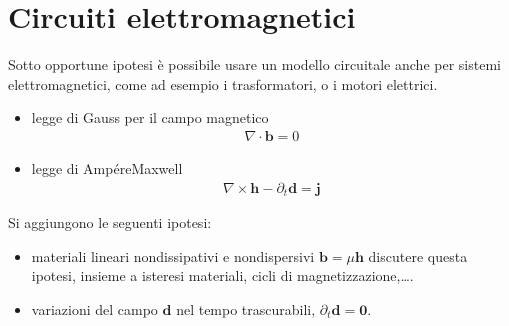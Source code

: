 \documentclass[letterpaper,10pt,italian]{jupyterBook}
\begin{document}
\section{Circuiti elettromagnetici}
\label{\detokenize{ch/circuits-electromagnetic:circuiti-elettromagnetici}}\label{\detokenize{ch/circuits-electromagnetic:classical-electromagnetism-circuits-electromagnetic}}\label{\detokenize{ch/circuits-electromagnetic::doc}}
\sphinxAtStartPar
Sotto opportune ipotesi è possibile usare un modello circuitale anche per sistemi elettromagnetici, come ad esempio i trasformatori, o i motori elettrici.
\begin{itemize}
\item {} 
\sphinxAtStartPar
legge di Gauss per il campo magnetico
\begin{equation*}
\begin{split}\nabla \cdot \mathbf{b} = 0\end{split}
\end{equation*}
\item {} 
\sphinxAtStartPar
legge di Ampére\sphinxhyphen{}Maxwell
\begin{equation*}
\begin{split}\nabla \times \mathbf{h} - \partial_t \mathbf{d} = \mathbf{j}\end{split}
\end{equation*}
\end{itemize}

\sphinxAtStartPar
Si aggiungono le seguenti ipotesi:
\begin{itemize}
\item {} 
\sphinxAtStartPar
materiali lineari non\sphinxhyphen{}dissipativi e non\sphinxhyphen{}dispersivi \(\mathbf{b} = \mu \mathbf{h}\)  discutere questa ipotesi, insieme a isteresi materiali, cicli di magnetizzazione,….

\item {} 
\sphinxAtStartPar
variazioni del campo \(\mathbf{d}\) nel tempo trascurabili, \(\partial_t \mathbf{d} = \mathbf{0}\).

\end{itemize}
\end{document}
